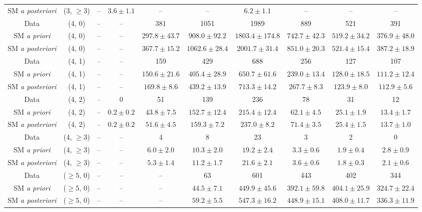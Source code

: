 \begin{table}[h!]
{\begin{tabular}{cccccccccc}
	SM \textit{a posteriori} & (3, $\ge3$) & -- & $3.6\pm 1.1$ & -- & -- & $6.2\pm 1.1$ & -- & -- & -- \\[0.5ex] 
	Data & (4, 0) & -- & -- & 381 & 1051 & 1989 & 889 & 521 & 391 \\[0.5ex] 
	SM \textit{a priori} & (4, 0) & -- & -- & $297.8\pm 43.7$ & $908.0\pm 92.2$ & $1803.4\pm 174.8$ & $742.7\pm 42.3$ & $519.2\pm 34.2$ & $376.9\pm 48.0$ \\[0.5ex] 
	SM \textit{a posteriori} & (4, 0) & -- & -- & $367.7\pm 15.2$ & $1062.6\pm 28.4$ & $2001.7\pm 31.4$ & $851.0\pm 20.3$ & $521.4\pm 15.4$ & $387.2\pm 18.9$ \\[0.5ex] 
	Data & (4, 1) & -- & -- & 159 & 429 & 688 & 256 & 127 & 107 \\[0.5ex] 
	SM \textit{a priori} & (4, 1) & -- & -- & $150.6\pm 21.6$ & $405.4\pm 28.9$ & $650.7\pm 61.6$ & $239.0\pm 13.4$ & $128.0\pm 18.5$ & $111.2\pm 12.4$ \\[0.5ex] 
	SM \textit{a posteriori} & (4, 1) & -- & -- & $169.8\pm 8.6$ & $439.2\pm 13.9$ & $713.3\pm 14.2$ & $267.7\pm 8.3$ & $123.9\pm 8.0$ & $112.9\pm 5.6$ \\[0.5ex] 
	Data & (4, 2) & -- & 0 & 51 & 139 & 236 & 78 & 31 & 12 \\[0.5ex] 
	SM \textit{a priori} & (4, 2) & -- & $0.2\pm 0.2$ & $43.8\pm 7.5$ & $152.7\pm 12.4$ & $215.4\pm 12.4$ & $62.1\pm 4.5$ & $25.1\pm 1.9$ & $13.4\pm 1.7$ \\[0.5ex] 
	SM \textit{a posteriori} & (4, 2) & -- & $0.2\pm 0.2$ & $51.6\pm 4.5$ & $159.3\pm 7.2$ & $237.0\pm 8.2$ & $71.4\pm 3.5$ & $25.4\pm 1.5$ & $13.7\pm 1.0$ \\[0.5ex] 
	Data & (4, $\ge3$) & -- & -- & 4 & 8 & 23 & 3 & 2 & 0 \\[0.5ex] 
	SM \textit{a priori} & (4, $\ge3$) & -- & -- & $6.0\pm 2.0$ & $10.3\pm 2.0$ & $19.2\pm 2.4$ & $3.3\pm 0.6$ & $1.9\pm 0.4$ & $2.8\pm 0.9$ \\[0.5ex] 
	SM \textit{a posteriori} & (4, $\ge3$) & -- & -- & $5.3\pm 1.4$ & $11.2\pm 1.7$ & $21.6\pm 2.1$ & $3.6\pm 0.6$ & $1.8\pm 0.3$ & $2.1\pm 0.6$ \\[0.5ex] 
	Data & ($\ge5$, 0) & -- & -- & -- & 63 & 601 & 443 & 402 & 344 \\[0.5ex] 
	SM \textit{a priori} & ($\ge5$, 0) & -- & -- & -- & $44.5\pm 7.1$ & $449.9\pm 45.6$ & $392.1\pm 59.8$ & $404.1\pm 25.9$ & $324.7\pm 22.4$ \\[0.5ex] 
	SM \textit{a posteriori} & ($\ge5$, 0) & -- & -- & -- & $59.2\pm 5.5$ & $547.3\pm 16.2$ & $448.9\pm 15.1$ & $408.0\pm 11.7$ & $336.3\pm 11.9$ \\[0.5ex] 

\end{tabular}}
\end{table}
